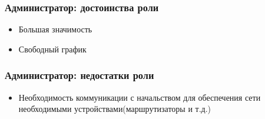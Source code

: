 \documentclass{../industrial-development}
\begin{document}
	\begin{frame} \frametitle{Администратор: достоинства роли}
		\begin{itemize}
			\item Большая значимость
			\item Свободный график
		\end{itemize}
	\end{frame}

	\begin{frame} \frametitle{Администратор: недостатки роли}
		\begin{itemize}
			\item Необходимость коммуникации с начальством для обеспечения сети необходимыми устройствами(маршрутизаторы и т.д.)
		\end{itemize}
	\end{frame}

	
	
\end{document}
